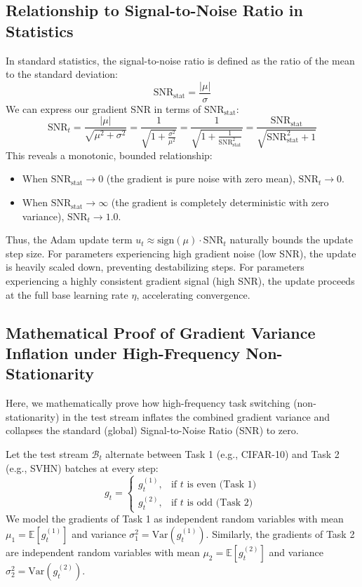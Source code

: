 \documentclass{article}
\theoremstyle{plain}
\theoremstyle{definition}
\theoremstyle{remark}
\begin{document}
\subsection{Relationship to Signal-to-Noise Ratio in Statistics}
In standard statistics, the signal-to-noise ratio is defined as the ratio of the mean to the standard deviation:
\begin{equation}
    \text{SNR}_{\text{stat}} = \frac{|\mu|}{\sigma}
\end{equation}
We can express our gradient SNR in terms of $\text{SNR}_{\text{stat}}$:
\begin{equation}
    \text{SNR}_t = \frac{|\mu|}{\sqrt{\mu^2 + \sigma^2}} = \frac{1}{\sqrt{1 + \frac{\sigma^2}{\mu^2}}} = \frac{1}{\sqrt{1 + \frac{1}{\text{SNR}_{\text{stat}}^2}}} = \frac{\text{SNR}_{\text{stat}}}{\sqrt{\text{SNR}_{\text{stat}}^2 + 1}}
\end{equation}
This reveals a monotonic, bounded relationship:
\begin{itemize}
    \item When $\text{SNR}_{\text{stat}} \to 0$ (the gradient is pure noise with zero mean), $\text{SNR}_t \to 0$.
    \item When $\text{SNR}_{\text{stat}} \to \infty$ (the gradient is completely deterministic with zero variance), $\text{SNR}_t \to 1.0$.
\end{itemize}
Thus, the Adam update term $u_t \approx \text{sign}(\mu) \cdot \text{SNR}_t$ naturally bounds the update step size. For parameters experiencing high gradient noise (low SNR), the update is heavily scaled down, preventing destabilizing steps. For parameters experiencing a highly consistent gradient signal (high SNR), the update proceeds at the full base learning rate $\eta$, accelerating convergence.

\subsection{Mathematical Proof of Gradient Variance Inflation under High-Frequency Non-Stationarity}
\label{subapp:variance_inflation}

Here, we mathematically prove how high-frequency task switching (non-stationarity) in the test stream inflates the combined gradient variance and collapses the standard (global) Signal-to-Noise Ratio (SNR) to zero.

Let the test stream $\mathcal{B}_t$ alternate between Task 1 (e.g., CIFAR-10) and Task 2 (e.g., SVHN) batches at every step:
\begin{equation}
    g_t = 
    \begin{cases}
        g_t^{(1)}, & \text{if } t \text{ is even (Task 1)} \\
        g_t^{(2)}, & \text{if } t \text{ is odd (Task 2)}
    \end{cases}
\end{equation}
We model the gradients of Task 1 as independent random variables with mean $\mu_1 = \mathbb{E}[g_t^{(1)}]$ and variance $\sigma_1^2 = \text{Var}(g_t^{(1)})$. Similarly, the gradients of Task 2 are independent random variables with mean $\mu_2 = \mathbb{E}[g_t^{(2)}]$ and variance $\sigma_2^2 = \text{Var}(g_t^{(2)})$.
\end{document}
